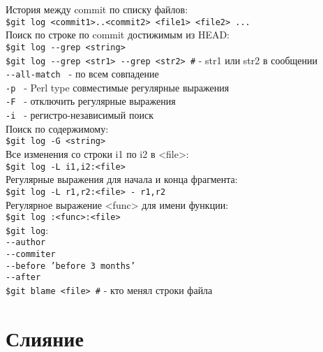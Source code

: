 \documentclass[12pt, a4paper]{article}
\begin{document}
\noindent История между commit по списку файлов: \\
\indent \texttt{\$git log <commit1>..<commit2> <file1> <file2> ...} \\

\noindent Поиск по строке по commit достижимым из HEAD: \\
\indent \texttt{\$git log {-}-grep <string>}\\
\noindent \texttt{\$git log {-}-grep <str1> {-}-grep <str2> \#} - str1 или str2 в сообщении \\
\indent \indent \texttt{{-}-all-match \indent} - по всем совпадение \\
\indent \indent \texttt{-p \indent} - Perl type совместимые регулярные выражения \\
\indent \indent \texttt{-F \indent} - отключить регулярные выражения \\
\indent \indent \texttt{-i \indent} - регистро-независимый поиск \\

\noindent Поиск по содержимому: \\
\indent \texttt{\$git log -G <string>}\\
\noindent Все изменения со строки i1 по i2 в <file>: \\
\indent \texttt{\$git log -L i1,i2:<file>}\\
\noindent Регулярные выражения для начала и конца фрагмента: \\
\indent \texttt{\$git log -L r1,r2:<file> - r1,r2}\\
\noindent Регулярное выражение <func> для имени функции: \\
\indent \texttt{\$git log :<func>:<file>} \\

\noindent \texttt{\$git log}: \\
\indent \texttt{{-}-author} \\
\indent \texttt{{-}-commiter} \\
\indent \texttt{{-}-before 'before 3 months'} \\
\indent \texttt{{-}-after} \\

\noindent \texttt{\$git blame <file> \indent\#} - кто менял строки файла \\



\section{Слияние}
\end{document}
